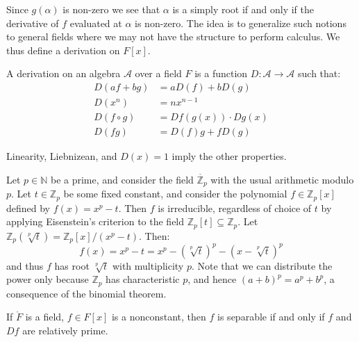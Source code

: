         Since $g(\alpha)$ is non-zero we see that $\alpha$ is a simply root
        if and only if the derivative of $f$ evaluated at $\alpha$ is
        non-zero. The idea is to generalize such notions to general fields
        where we may not have the structure to perform calculus. We thus
        define a derivation on $F[x]$.
        \begin{definition}
            A derivation on an algebra $\mathscr{A}$ over a field $F$ is a
            function $D:\mathscr{A}\rightarrow\mathscr{A}$ such that:
            \begin{align}
                D(af+bg)&=aD(f)+bD(g)\\
                D(x^{n})&=nx^{n-1}\\
                D(f\circ{g})&=Df(g(x))\cdot{D}g(x)\\
                D(fg)&=D(f)g+fD(g)
            \end{align}
        \end{definition}
        \begin{theorem}
            Linearity, Liebnizean, and $D(x)=1$ imply the other properties.
        \end{theorem}
        \begin{example}
            Let $p\in\mathbb{N}$ be a prime, and consider the field
            $\ring{\mathbb{Z}_{p}}$ with the usual arithmetic modulo $p$.
            Let $t\in\mathbb{Z}_{p}$ be some fixed constant, and consider
            the polynomial $f\in\mathbb{Z}_{p}[x]$ defined by
            $f(x)=x^{p}-t$. Then $f$ is irreducible, regardless of choice of
            $t$ by applying Eisenstein's criterion to the field
            $\mathbb{Z}_{p}[t]\subseteq\mathbb{Z}_{p}$. Let
            $\mathbb{Z}_{p}(\sqrt[p]{t})=\mathbb{Z}_{p}[x]/(x^{p}-t)$. Then:
            \begin{equation}
                f(x)=x^{p}-t=x^{p}-(\sqrt[p]{t})^{p}-(x-\sqrt[p]{t})^{p}
            \end{equation}
            and thus $f$ has root $\sqrt[p]{t}$ with multiplicity $p$. Note
            that we can distribute the power only because $\mathbb{Z}_{p}$
            has characteristic $p$, and hence $(a+b)^{p}=a^{p}+b^{p}$,
            a consequence of the binomial theorem.
        \end{example}
        \begin{theorem}
            If $\ring{F}$ is a field, $f\in{F}[x]$ is a nonconstant, then
            $f$ is separable if and only if $f$ and $Df$ are relatively
            prime.
        \end{theorem}
